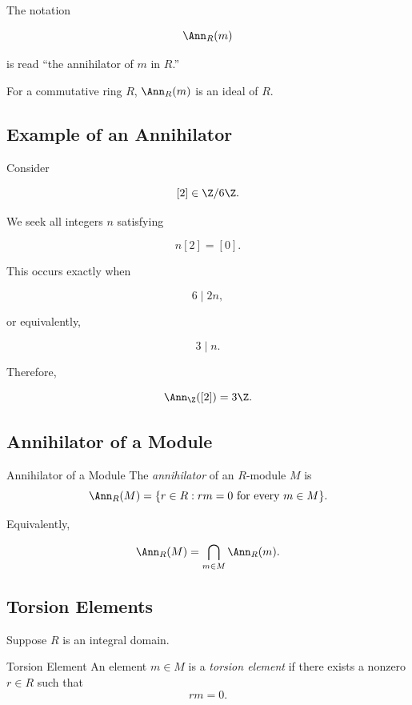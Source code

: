 The notation

\[ \Ann_R(m) \]

is read ``the annihilator of \(m\) in \(R\).''

For a commutative ring \(R\), \(\Ann_R(m)\) is an ideal of \(R\).

\subsection{Example of an Annihilator}
\label{subsec:annihilator-example}

Consider

\[ [2]\in\Z/6\Z. \]

We seek all integers \(n\) satisfying

\[ n[2]=[0]. \]

This occurs exactly when

\[ 6\mid2n, \]

or equivalently,

\[ 3\mid n. \]

Therefore,

\[ \Ann_{\Z}([2])=3\Z. \]

\subsection{Annihilator of a Module}
\label{subsec:annihilator-module}

\begin{definitionbox}{Annihilator of a Module}
The \emph{annihilator} of an \(R\)-module \(M\) is
\[ \Ann_R(M)=\{r\in R:rm=0\text{ for every }m\in M\}. \]
\end{definitionbox}

Equivalently,

\[ \Ann_R(M)=\bigcap_{m\in M}\Ann_R(m). \]

\subsection{Torsion Elements}
\label{subsec:torsion-elements}

Suppose \(R\) is an integral domain.

\begin{definitionbox}{Torsion Element}
An element \(m\in M\) is a \emph{torsion element} if there exists a nonzero
\(r\in R\) such that
\[ rm=0. \]
\end{definitionbox}

